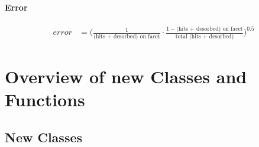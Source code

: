 \subsubsection*{Error}
\begin{equation}
	\label{eq:error}
	\begin{split}
		error&=\Big( \frac{1}{\text{(hits + desorbed) on facet}} \cdot \frac{1-\text{(hits + desorbed) on facet}}{\text{total (hits + desorbed)}} \Big)^{0.5}
	\end{split}
\end{equation}

\chapter{Overview of new Classes and Functions}

\section{New Classes}


